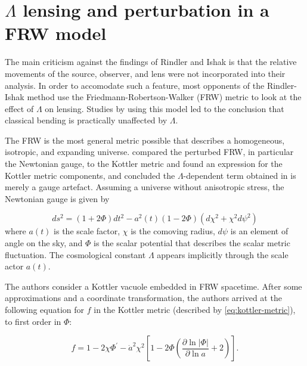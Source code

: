 \section{$\Lambda$ lensing and perturbation in a FRW model}\label{section:frw}


The main criticism against the findings of Rindler and Ishak is that the relative movements of the source, observer, and lens were not incorporated into their analysis. In order to accomodate such a feature, most opponents of the Rindler-Ishak method use the Friedmann-Robertson-Walker (FRW) metric to look at the effect of $\Lambda$ on lensing. Studies by \citet{Park2008,Khriplovich2008,Simpson2008} using this model led to the conclusion that classical bending is practically unaffected by $\Lambda$. 


The FRW is the most general metric possible that describes a homogeneous, isotropic, and expanding universe. \citet{Simpson2008} compared the perturbed FRW, in particular the Newtonian gauge, to the Kottler metric and found an expression for the Kottler metric components, and concluded the $\Lambda$-dependent term obtained in \citet{Rindler2007} is merely a gauge artefact. Assuming a universe without anisotropic stress, the Newtonian gauge is given by 

\begin{equation}
  ds^2 = (1 + 2 \Phi) dt^2 - a^2(t) (1 - 2 \Phi)(d \chi^2 + \chi^2 d \psi^2)
  \label{eq:newtonian-gauge}
\end{equation}
where $a(t)$ is the scale factor, $\chi$ is the comoving radius, $d\psi$ is an element of angle on the sky, and $\Phi$ is the scalar potential that describes the scalar metric fluctuation. The cosmological constant $\Lambda$ appears implicitly through the scale actor $a(t)$. 

The authors consider a Kottler vacuole embedded in FRW spacetime. After some approximations and a coordinate transformation, the authors arrived at the following equation for $f$ in the Kottler metric (described by \eqref{eq:kottler-metric}), to first order in $\Phi$:

\begin{equation}
  f = 1 - 2 \chi \Phi^{\prime} - \dot{a}^2 \chi^2 \left [ 1 - 2 \Phi \left ( \frac{\partial \ln \vert \Phi \vert}{\partial \ln a} + 2 \right ) \right ].
  \label{eq:simpsons-f}
\end{equation}

